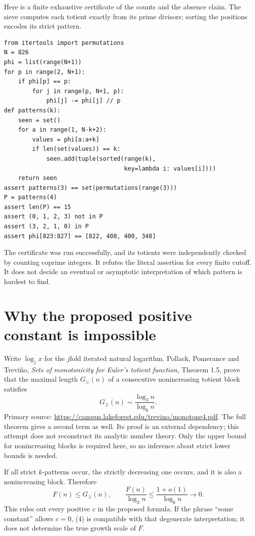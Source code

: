 \documentclass[11pt]{article}
\begin{document}
Here is a finite exhaustive certificate of the counts and the absence claim. The sieve computes each totient exactly from its prime divisors; sorting the positions encodes its strict pattern.
\begin{verbatim}
from itertools import permutations
N = 826
phi = list(range(N+1))
for p in range(2, N+1):
    if phi[p] == p:
        for j in range(p, N+1, p):
            phi[j] -= phi[j] // p
def patterns(k):
    seen = set()
    for a in range(1, N-k+2):
        values = phi[a:a+k]
        if len(set(values)) == k:
            seen.add(tuple(sorted(range(k),
                                  key=lambda i: values[i])))
    return seen
assert patterns(3) == set(permutations(range(3)))
P = patterns(4)
assert len(P) == 15
assert (0, 1, 2, 3) not in P
assert (3, 2, 1, 0) in P
assert phi[823:827] == [822, 408, 400, 348]
\end{verbatim}
The certificate was run successfully, and its totients were independently checked by counting coprime integers. It refutes the literal assertion for every finite cutoff. It does not decide an eventual or asymptotic interpretation of which pattern is hardest to find.

\section*{Why the proposed positive constant is impossible}
Write $\log_j x$ for the $j$fold iterated natural logarithm. Pollack, Pomerance and Trevi\~no, \emph{Sets of monotonicity for Euler's totient function}, Theorem 1.5, prove that the maximal length $G_{\ge}(n)$ of a consecutive nonincreasing totient block satisfies
\[
 G_{\ge}(n)\sim\frac{\log_3 n}{\log_6 n}. \tag{3}
\]
Primary source: \url{https://campus.lakeforest.edu/trevino/monotone4.pdf}. The full theorem gives a second term as well. Its proof is an external dependency; this attempt does not reconstruct its analytic number theory. Only the upper bound for nonincreasing blocks is required here, so no inference about strict lower bounds is needed.

If all strict $k$-patterns occur, the strictly decreasing one occurs, and it is also a nonincreasing block. Therefore
\[
 F(n)\le G_{\ge}(n),\qquad
 \frac{F(n)}{\log_3 n}\le\frac{1+o(1)}{\log_6 n}\longrightarrow0. \tag{4}
\]
This rules out every positive $c$ in the proposed formula. If the phrase ``some constant'' allows $c=0$, (4) is compatible with that degenerate interpretation; it does not determine the true growth scale of $F$.
\end{document}
